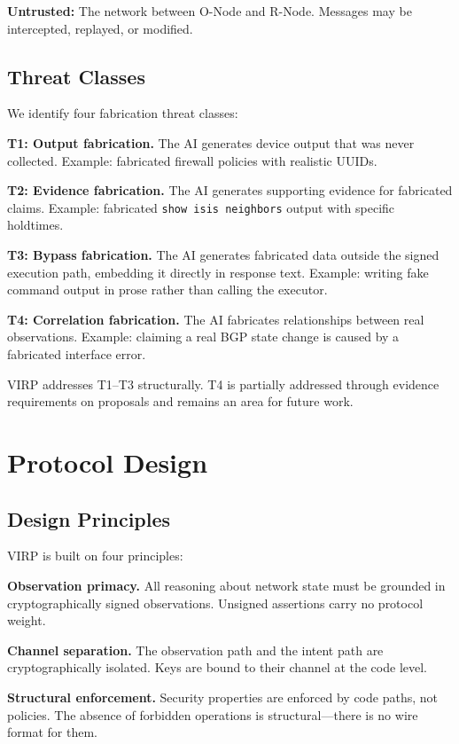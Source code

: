 \documentclass[11pt,twocolumn]{article}
\begin{document}
\textbf{Untrusted:} The network between O-Node and R-Node. Messages may be intercepted, replayed, or modified.

\subsection{Threat Classes}

We identify four fabrication threat classes:

\textbf{T1: Output fabrication.} The AI generates device output that was never collected. Example: fabricated firewall policies with realistic UUIDs.

\textbf{T2: Evidence fabrication.} The AI generates supporting evidence for fabricated claims. Example: fabricated \texttt{show isis neighbors} output with specific holdtimes.

\textbf{T3: Bypass fabrication.} The AI generates fabricated data outside the signed execution path, embedding it directly in response text. Example: writing fake command output in prose rather than calling the executor.

\textbf{T4: Correlation fabrication.} The AI fabricates relationships between real observations. Example: claiming a real BGP state change is caused by a fabricated interface error.

VIRP addresses T1--T3 structurally. T4 is partially addressed through evidence requirements on proposals and remains an area for future work.

\section{Protocol Design}

\subsection{Design Principles}

VIRP is built on four principles:

\textbf{Observation primacy.} All reasoning about network state must be grounded in cryptographically signed observations. Unsigned assertions carry no protocol weight.

\textbf{Channel separation.} The observation path and the intent path are cryptographically isolated. Keys are bound to their channel at the code level.

\textbf{Structural enforcement.} Security properties are enforced by code paths, not policies. The absence of forbidden operations is structural---there is no wire format for them.
\end{document}
